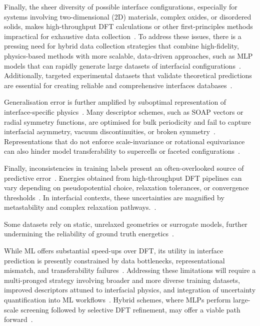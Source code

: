 Finally, the sheer diversity of possible interface configurations, especially for systems involving two-dimensional (2D) materials, complex oxides, or disordered solids, makes high-throughput DFT calculations or other first-principles methods impractical for exhaustive data collection~\cite{Chagarov2015-ol, Di_Liberto2022-gz}.
To address these issues, there is a pressing need for hybrid data collection strategies that combine high-fidelity, physics-based methods with more scalable, data-driven approaches, such as MLP models that can rapidly generate large datasets of interfacial configurations~\cite{Schutt2017-ge, Batzner2022-fd, Gerber2023-yd}.
Additionally, targeted experimental datasets that validate theoretical predictions are essential for creating reliable and comprehensive interfaces databases~\cite{Hepplestone2010-vw, Schutt2019-sz, Gerber2023-yd}.

Generalisation error is further amplified by suboptimal representation of interface-specific physics~\nocite{}.
Many descriptor schemes, such as SOAP vectors or radial symmetry functions, are optimised for bulk periodicity and fail to capture interfacial asymmetry, vacuum discontinuities, or broken symmetry~\cite{Zuo2019-wo}.
Representations that do not enforce scale-invariance or rotational equivariance can also hinder model transferability to supercells or faceted configurations~\cite{Batzner2022-fd, Uhrin2025-ba}.

\newpage Finally, inconsistencies in training labels present an often-overlooked source of predictive error~\nocite{}.
Energies obtained from high-throughput DFT pipelines can vary depending on pseudopotential choice, relaxation tolerances, or convergence thresholds~\cite{Rosen2022-pw, Uhrin2025-ba}.
In interfacial contexts, these uncertainties are magnified by metastability and complex relaxation pathways.~\nocite{}.

Some datasets rely on static, unrelaxed geometries or surrogate models, further undermining the reliability of ground truth energetics~\cite{Gerber2023-yd, Uhrin2025-ba}.

While ML offers substantial speed-ups over DFT, its utility in interface prediction is presently constrained by data bottlenecks, representational mismatch, and transferability failures~\nocite{}.
Addressing these limitations will require a multi-pronged strategy involving broader and more diverse training datasets, improved descriptors attuned to interfacial physics, and integration of uncertainty quantification into ML workflows~\nocite{}.
Hybrid schemes, where MLPs perform large-scale screening followed by selective DFT refinement, may offer a viable path forward~\nocite{}.

